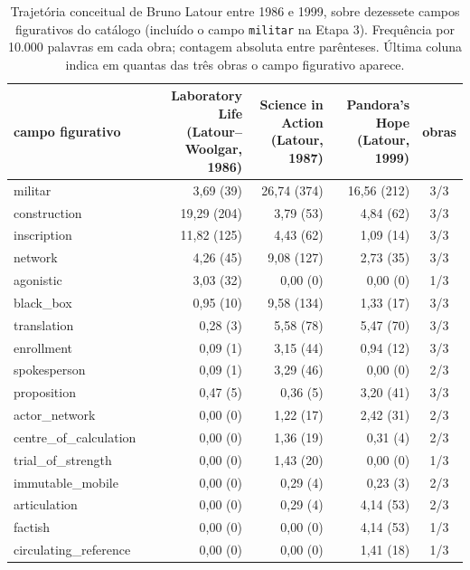 
\begin{table}[ht]
\centering
\caption[Trajetória conceitual de Bruno Latour, 1986--1999]{Trajetória conceitual de Bruno Latour entre 1986 e 1999, sobre dezessete campos figurativos do catálogo (incluído o campo \texttt{militar} na Etapa 3). Frequência por 10.000 palavras em cada obra; contagem absoluta entre parênteses. Última coluna indica em quantas das três obras o campo figurativo aparece.}
\label{tab:trajetoria-latour}
\begin{tabular}{lrrrc}
\toprule
campo figurativo & \makecell{Laboratory Life\\(Latour--Woolgar, 1986)} & \makecell{Science in Action\\(Latour, 1987)} & \makecell{Pandora's Hope\\(Latour, 1999)} & obras \\
\midrule
militar & 3{,}69 (39) & 26{,}74 (374) & 16{,}56 (212) & 3/3 \\
construction & 19{,}29 (204) & 3{,}79 (53) & 4{,}84 (62) & 3/3 \\
inscription & 11{,}82 (125) & 4{,}43 (62) & 1{,}09 (14) & 3/3 \\
network & 4{,}26 (45) & 9{,}08 (127) & 2{,}73 (35) & 3/3 \\
agonistic & 3{,}03 (32) & 0{,}00 (0) & 0{,}00 (0) & 1/3 \\
black\_box & 0{,}95 (10) & 9{,}58 (134) & 1{,}33 (17) & 3/3 \\
translation & 0{,}28 (3) & 5{,}58 (78) & 5{,}47 (70) & 3/3 \\
enrollment & 0{,}09 (1) & 3{,}15 (44) & 0{,}94 (12) & 3/3 \\
spokesperson & 0{,}09 (1) & 3{,}29 (46) & 0{,}00 (0) & 2/3 \\
proposition & 0{,}47 (5) & 0{,}36 (5) & 3{,}20 (41) & 3/3 \\
actor\_network & 0{,}00 (0) & 1{,}22 (17) & 2{,}42 (31) & 2/3 \\
centre\_of\_calculation & 0{,}00 (0) & 1{,}36 (19) & 0{,}31 (4) & 2/3 \\
trial\_of\_strength & 0{,}00 (0) & 1{,}43 (20) & 0{,}00 (0) & 1/3 \\
immutable\_mobile & 0{,}00 (0) & 0{,}29 (4) & 0{,}23 (3) & 2/3 \\
articulation & 0{,}00 (0) & 0{,}29 (4) & 4{,}14 (53) & 2/3 \\
factish & 0{,}00 (0) & 0{,}00 (0) & 4{,}14 (53) & 1/3 \\
circulating\_reference & 0{,}00 (0) & 0{,}00 (0) & 1{,}41 (18) & 1/3 \\
\bottomrule
\end{tabular}
\end{table}
